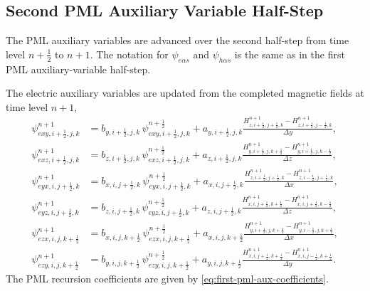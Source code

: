 \documentclass{article}
\numberwithin{equation}{section}
\numberwithin{figure}{section}
\begin{document}
\subsection{Second PML Auxiliary Variable Half-Step}

The PML auxiliary variables are advanced over the second half-step from time level $n+\tfrac12$ to $n+1$. The notation for $\psi_{e\alpha s}$ and $\psi_{h\alpha s}$ is the same as in the first PML auxiliary-variable half-step.

The electric auxiliary variables are updated from the completed magnetic fields at time level $n+1$,
\begin{subequations}\label{eq:second-pml-aux-e}
    \begin{align}
        \psi_{exy,i+\tfrac12,j,k}^{n+1} & = b_{y,i+\tfrac12,j,k}\,\psi_{exy,i+\tfrac12,j,k}^{n+\frac12} +a_{y,i+\tfrac12,j,k} \frac{H_{z,i+\tfrac12,j+\tfrac12,k}^{n+1}-H_{z,i+\tfrac12,j-\tfrac12,k}^{n+1}}{\Delta y}, \\
        \psi_{exz,i+\tfrac12,j,k}^{n+1} & = b_{z,i+\tfrac12,j,k}\,\psi_{exz,i+\tfrac12,j,k}^{n+\frac12} +a_{z,i+\tfrac12,j,k} \frac{H_{y,i+\tfrac12,j,k+\tfrac12}^{n+1}-H_{y,i+\tfrac12,j,k-\tfrac12}^{n+1}}{\Delta z}, \\
        \psi_{eyx,i,j+\tfrac12,k}^{n+1} & = b_{x,i,j+\tfrac12,k}\,\psi_{eyx,i,j+\tfrac12,k}^{n+\frac12} +a_{x,i,j+\tfrac12,k} \frac{H_{z,i+\tfrac12,j+\tfrac12,k}^{n+1}-H_{z,i-\tfrac12,j+\tfrac12,k}^{n+1}}{\Delta x}, \\
        \psi_{eyz,i,j+\tfrac12,k}^{n+1} & = b_{z,i,j+\tfrac12,k}\,\psi_{eyz,i,j+\tfrac12,k}^{n+\frac12} +a_{z,i,j+\tfrac12,k} \frac{H_{x,i,j+\tfrac12,k+\tfrac12}^{n+1}-H_{x,i,j+\tfrac12,k-\tfrac12}^{n+1}}{\Delta z}, \\
        \psi_{ezx,i,j,k+\tfrac12}^{n+1} & = b_{x,i,j,k+\tfrac12}\,\psi_{ezx,i,j,k+\tfrac12}^{n+\frac12} +a_{x,i,j,k+\tfrac12} \frac{H_{y,i+\tfrac12,j,k+\tfrac12}^{n+1}-H_{y,i-\tfrac12,j,k+\tfrac12}^{n+1}}{\Delta x}, \\
        \psi_{ezy,i,j,k+\tfrac12}^{n+1} & = b_{y,i,j,k+\tfrac12}\,\psi_{ezy,i,j,k+\tfrac12}^{n+\frac12} +a_{y,i,j,k+\tfrac12} \frac{H_{x,i,j+\tfrac12,k+\tfrac12}^{n+1}-H_{x,i,j-\tfrac12,k+\tfrac12}^{n+1}}{\Delta y}.
    \end{align}
\end{subequations}
The PML recursion coefficients are given by \eqref{eq:first-pml-aux-coefficients}.
\end{document}
